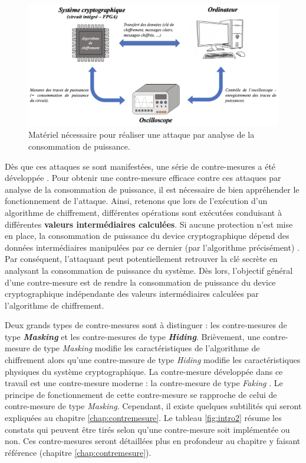 \documentclass[oneside]{book}
\begin{document}
\begin{figure}[h]
    \centering
    \includegraphics[scale=0.63]{image/intro.png}
    \caption{Matériel nécessaire pour réaliser une attaque par analyse de la consommation de puissance.}
    \label{fig:intro}
\end{figure}

Dès que ces attaques se sont manifestées, une série de contre-mesures a été développée \cite{mangard_power_2007}\cite{fernando}. Pour obtenir une contre-mesure efficace contre ces attaques par analyse de la consommation de puissance, il est nécessaire de bien appréhender le fonctionnement de l'attaque. Ainsi, retenons que lors de l’exécution d’un algorithme de chiffrement, différentes opérations sont exécutées conduisant à différentes \textbf{valeurs intermédiaires calculées}. Si aucune protection n’est mise en place, la consommation de puissance du device cryptographique dépend des données intermédiaires manipulées par ce dernier (par l’algorithme précisément) \cite{mangard_power_2007}. Par conséquent, l’attaquant peut potentiellement retrouver la clé secrète en analysant la consommation de puissance du système. Dès lors, l'objectif général d'une contre-mesure est de rendre la consommation de puissance du device cryptographique indépendante des valeurs intermédiaires calculées par l'algorithme de chiffrement. 

Deux grands types de contre-mesures sont à distinguer : les contre-mesures \cite{mangard_power_2007}\cite{fernando} de type \textbf{\textit{Masking}} et les contre-mesures de type \textbf{\textit{Hiding}}. Brièvement, une contre-mesure de type \textit{Masking} modifie les caractéristiques de l'algorithme de chiffrement alors qu'une contre-mesure de type \textit{Hiding} modifie les caractéristiques physiques du système cryptographique. La contre-mesure développée dans ce travail est une contre-mesure moderne : la contre-mesure de type \textit{Faking} \cite{lumbiarres-lopez_faking_2018}. Le principe de fonctionnement de cette contre-mesure se rapproche de celui de contre-mesure de type \textit{Masking}. Cependant, il existe quelques subtilités qui seront expliquées au chapitre \ref{chap:contremesure}. Le tableau \ref{fig:intro2} résume les constats qui peuvent être tirés selon qu'une contre-mesure soit implémentée ou non. Ces contre-mesures seront détaillées plus en profondeur au chapitre y faisant référence (chapitre \ref{chap:contremesure}).
\end{document}
